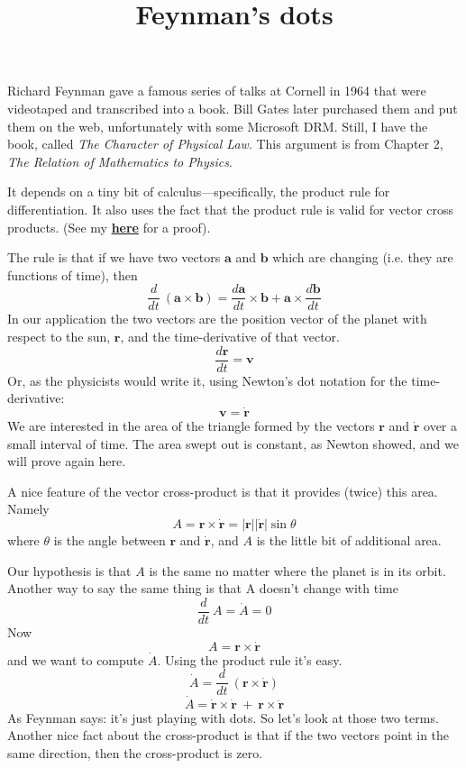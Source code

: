 \documentclass[11pt, oneside]{article}
\title{Feynman's dots}
\date{}
\begin{document}
\maketitle
\Large

Richard Feynman gave a famous series of talks at Cornell in 1964 that were videotaped and transcribed into a book.  Bill Gates later purchased them and put them on the web, unfortunately with some Microsoft DRM.  Still, I have the book, called \emph{The Character of Physical Law}.  This argument is from Chapter 2, \emph{The Relation of Mathematics to Physics}.

It depends on a tiny bit of calculus---specifically, the product rule for differentiation.  It also uses the fact that the product rule is valid for vector cross products.  (See my \hyperref[sec:Vector_cross_product]{\textbf{here}} for a proof).

The rule is that if we have two vectors $\mathbf{a}$ and $\mathbf{b}$ which are changing (i.e. they are functions of time), then
\[ \frac{d}{dt} \ (\mathbf{a} \times \mathbf{b}) = \frac{d\mathbf{a}}{dt} \times \mathbf{b} + \mathbf{a}  \times \frac{d\mathbf{b}}{dt}    \]
In our application the two vectors are the position vector of the planet with respect to the sun, $\mathbf{r}$, and the time-derivative of that vector.
\[ \frac{d\mathbf{r}}{dt} = \mathbf{v} \]
Or, as the physicists would write it, using Newton's dot notation for the time-derivative:
\[ \mathbf{v} = \dot{\mathbf{r}} \]
We are interested in the area of the triangle formed by the vectors $\mathbf{r}$ and $\dot{\mathbf{r}}$ over a small interval of time.  The area swept out is constant, as Newton showed, and we will prove again here.

A nice feature of the vector cross-product is that it provides (twice) this area.  Namely
\[ A =  \mathbf{r} \times \dot{\mathbf{r}} = |\mathbf{r}| |\dot{\mathbf{r}}| \sin \theta   \]
where $\theta$ is the angle between $\mathbf{r}$ and $\dot{\mathbf{r}}$, and $A$ is the little bit of additional area.

Our hypothesis is that $A$ is the same no matter where the planet is in its orbit.  Another way to say the same thing is that A doesn't change with time
\[ \frac{d}{dt} \ A = \dot A = 0 \]
Now 
\[ A = \mathbf{r} \times \dot{\mathbf{r}} \]
and we want to compute $\dot A$.  Using the product rule it's easy.
\[ \dot A = \frac{d}{dt} \ (\mathbf{r} \times \dot{\mathbf{r}}) \]
\[ \dot A = \dot{\mathbf{r}} \times \dot{\mathbf{r}} \ + \ \mathbf{r} \times \ddot{\mathbf{r}} \]
As Feynman says: it's just playing with dots.  So let's look at those two terms.  Another nice fact about the cross-product is that if the two vectors point in the same direction, then the cross-product is zero.
\end{document}
